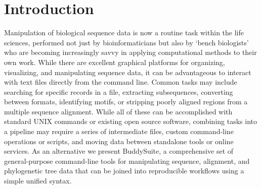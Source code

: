 \documentclass[nogrid]{MBE}%
\begin{document}
\section{{Introduction}\label{sec:Intro}}
Manipulation of biological sequence data is now a routine task within the life sciences, performed not just by bioinformaticians but also by `bench biologists' who are becoming increasingly savvy in applying computational methods to their own work. While there are excellent graphical platforms for organizing, visualizing, and manipulating sequence data, it can be advantageous to interact with text files directly from the command line. Common tasks may include searching for specific records in a file, extracting subsequences, converting between formats, identifying motifs, or stripping poorly aligned regions from a multiple sequence alignment. While all of these can be accomplished with standard UNIX commands or existing open source software, combining tasks into a pipeline may require a series of intermediate files, custom command-line operations or scripts, and moving data between standalone tools or online services. As an alternative we present BuddySuite, a comprehensive set of general-purpose command-line tools for manipulating sequence, alignment, and phylogenetic tree data that can be joined into reproducible workflows using a simple unified syntax.
\end{document}
